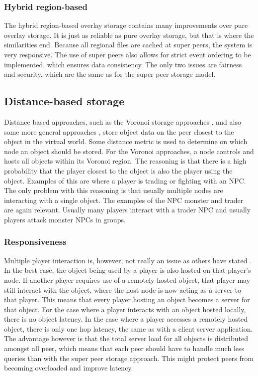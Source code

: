\documentclass[10pt,a4paper,journal,cspaper,compsoc]{IEEEtran}
\begin{document}
\subsubsection{Hybrid region-based}
The hybrid region-based overlay storage contains many improvements over pure overlay storage. It is just as reliable as pure overlay storage, but
that is where the similarities end. Because all regional files are cached at super peers, the system is very responsive. The use of super peers also
allows for strict event ordering to be implemented, which ensures data consistency. The only two issues are fairness and security, which are the same
as for the super peer storage model.

\subsection{Distance-based storage}

Distance based approaches, such as the Voronoi storage approaches \cite{Buyukkaya_voronoi_state_management}, \cite{Hu_voronoi_IM} and also some more
general approaches \cite{colyseus_distance_based}, store object data on the peer closest to the object in the virtual world. Some distance metric is
used to determine on which node an object should be stored. For the Voronoi approaches, a node controls and hosts all objects within its Voronoi
region. The reasoning is that there is a high probability that the player closest to the object is also the player using the object. Examples of this
are where a player is trading or fighting with an NPC. The only problem with this reasoning is that usually multiple nodes are interacting with a
single object. The examples of the NPC monster and trader are again relevant. Usually many players interact with a trader NPC and usually players
attack monster NPCs in groups.

\subsubsection{Responsiveness}
Multiple player interaction is, however, not really an issue as others have stated \cite{Fan_deisgn_issues_p2p}. In the best case, the object being
used by a player is also hosted on that player's node. If another player requires use of a remotely hosted object, that player may still interact
with the object, where the host node is now acting as a server to that player. This means that every player hosting an object becomes a server for
that object. For the case where a player interacts with an object hosted locally, there is no object latency. In the case where a player accesses a
remotely hosted object, there is only one hop latency, the same as with a client server application. The advantage however is that the total server
load for all objects is distributed amongst all peer, which means that each peer should have to handle much less queries than with the super peer
storage approach. This might protect peers from becoming overloaded and improve latency.
\end{document}
